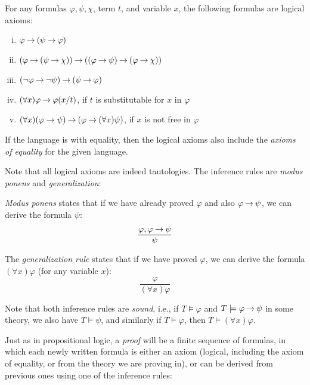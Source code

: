\begin{definition}
For any formulas $\varphi,\psi,\chi$, term $t$, and variable $x$, the following formulas are logical axioms:
\begin{enumerate}[(i)]
    \item $\varphi \mathbin{\rightarrow} (\psi \mathbin{\rightarrow} \varphi)$
    \item $(\varphi\mathbin{\rightarrow} (\psi \mathbin{\rightarrow} \chi))\mathbin{\rightarrow} ((\varphi \mathbin{\rightarrow} \psi)\mathbin{\rightarrow}(\varphi \mathbin{\rightarrow} \chi))$
    \item $(\neg \varphi \mathbin{\rightarrow} \neg \psi)\mathbin{\rightarrow}(\psi \mathbin{\rightarrow} \varphi)$
    \item $(\forall x)\varphi \mathbin{\rightarrow} \varphi(x/t)$, if $t$ is substitutable for $x$ in $\varphi$
    \item $(\forall x)(\varphi \to \psi) \mathbin{\rightarrow} (\varphi \mathbin{\rightarrow} (\forall x)\psi)$, if $x$ is not free in $\varphi$
\end{enumerate}
If the language is with equality, then the logical axioms also include the \emph{axioms of equality} for the given language.       
\end{definition}

Note that all logical axioms are indeed tautologies. The inference rules are \emph{modus ponens} and \emph{generalization}: 

\begin{definition}
\emph{Modus ponens} states that if we have already proved $\varphi$ and also $\varphi\mathbin{\rightarrow}\psi$, we can derive the formula $\psi$:
$$
\frac{\varphi, \varphi \mathbin{\rightarrow} \psi}{\psi}
$$ 
\end{definition}

\begin{definition}
    The \emph{generalization rule} states that if we have proved $\varphi$, we can derive the formula $(\forall x)\varphi$ (for any variable $x$):
    $$
    \frac{\varphi}{(\forall x)\varphi}
    $$ 
\end{definition}

Note that both inference rules are \emph{sound}, i.e., if $T\models\varphi$ and $T\models\varphi\mathbin{\rightarrow}\psi$ in some theory, we also have $T\models\psi$, and similarly if $T\models\varphi$, then $T\models(\forall x)\varphi$.

Just as in propositional logic, a \emph{proof} will be a finite sequence of formulas, in which each newly written formula is either an axiom (logical, including the axiom of equality, or from the theory we are proving in), or can be derived from previous ones using one of the inference rules:

